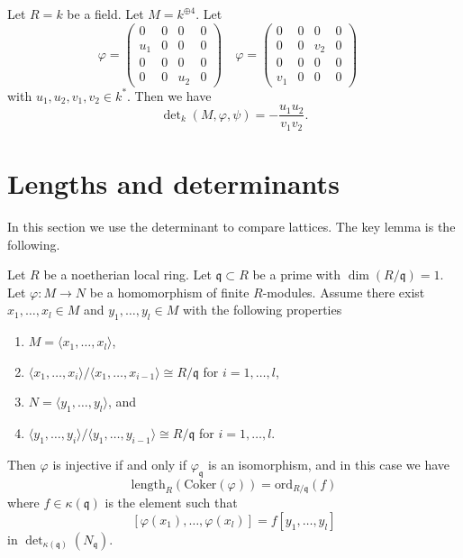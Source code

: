 \begin{example}
\label{example-a-la-oort}
Let $R = k$ be a field.
Let $M = k^{\oplus 4}$.
Let
$$
\varphi =
\left(
\begin{matrix}
  0 &   0 &   0 &   0 \\
u_1 &   0 &   0 &   0 \\
  0 &   0 &   0 &   0 \\
  0 &   0 & u_2 &   0
\end{matrix}
\right)
\quad
\varphi =
\left(
\begin{matrix}
  0 &   0 &   0 &   0 \\
  0 &   0 & v_2 &   0 \\
  0 &   0 &   0 &   0 \\
v_1 &   0 &   0 &   0
\end{matrix}
\right)
\quad
$$
with $u_1, u_2, v_1, v_2 \in k^*$.
Then we have
$$
\det\nolimits_k(M, \varphi, \psi) = -\frac{u_1u_2}{v_1v_2}.
$$
\end{example}









\section{Lengths and determinants}
\label{section-length-determinant}

\noindent
In this section we use the determinant to compare lattices.
The key lemma is the following.

\begin{lemma}
\label{lemma-key-lemma}
Let $R$ be a noetherian local ring.
Let $\mathfrak q \subset R$ be a prime with $\dim(R/\mathfrak q) = 1$.
Let $\varphi : M \to N$ be a homomorphism of finite $R$-modules.
Assume there exist $x_1, \ldots, x_l \in M$ and $y_1, \ldots, y_l \in M$
with the following properties
\begin{enumerate}
\item $M = \langle x_1, \ldots, x_l\rangle$,
\item $\langle x_1, \ldots, x_i\rangle / \langle x_1, \ldots, x_{i - 1}\rangle
\cong R/\mathfrak q$ for $i = 1, \ldots, l$,
\item $N = \langle y_1, \ldots, y_l\rangle$, and
\item $\langle y_1, \ldots, y_i\rangle / \langle y_1, \ldots, y_{i - 1}\rangle
\cong R/\mathfrak q$ for $i = 1, \ldots, l$.
\end{enumerate}
Then $\varphi$ is injective if and only if $\varphi_{\mathfrak q}$ is an
isomorphism, and in this case we have
$$
\text{length}_R(\text{Coker}(\varphi)) = \text{ord}_{R/\mathfrak q}(f)
$$
where $f \in \kappa(\mathfrak q)$ is the element such that
$$
[\varphi(x_1), \ldots, \varphi(x_l)] = f [y_1, \ldots, y_l]
$$
in $\det_{\kappa(\mathfrak q)}(N_{\mathfrak q})$.
\end{lemma}

